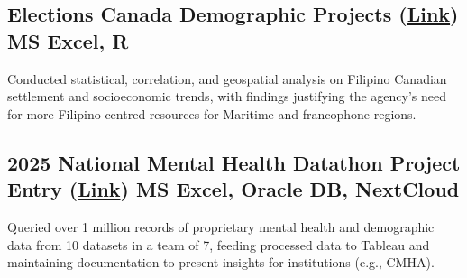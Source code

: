 \subsection{{Elections Canada Demographic Projects (\href{https://github.com/Francis-Calingo/Elections-Canada-Demographic-Projects}{Link}) \hfill MS Excel, R}}
Conducted statistical, correlation, and geospatial analysis on Filipino Canadian settlement and socioeconomic trends,
with findings justifying the agency’s need for more Filipino-centred resources for Maritime and francophone regions.

\vfill

\subsection{{2025 National Mental Health Datathon Project Entry (\href{https://github.com/Francis-Calingo/Proprietary-Data-Projects/?tab=readme-ov-file#2025-national-mental-health-datathon}{Link}) \hfill  MS Excel, Oracle DB, NextCloud}}
Queried over 1 million records of proprietary mental health and demographic data from 10 datasets in a team of 7,
feeding processed data to Tableau and maintaining documentation to present insights for institutions (e.g., CMHA).